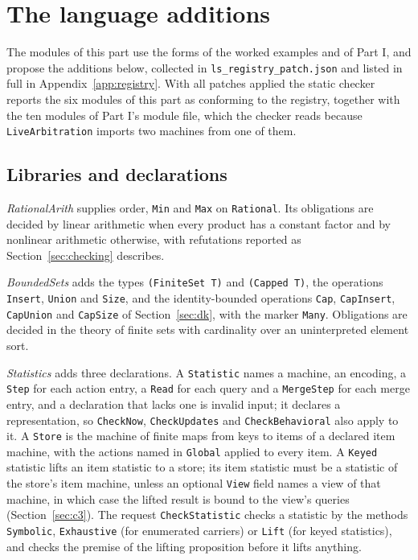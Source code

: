 \documentclass[11pt]{article}
\newcommand{\fpath}[1]{\nolinkurl{#1}}
\newcommand{\code}[1]{\texttt{#1}}
\theoremstyle{definition}
\theoremstyle{plain}
\begin{document}
\section{The language additions}\label{sec:language}

The modules of this part use the forms of the worked examples and of Part I, and propose the
additions below, collected in \fpath{ls_registry_patch.json} and listed in full in
Appendix~\ref{app:registry}. With all patches applied the static checker reports the six modules of
this part as conforming to the registry, together with the ten modules of Part I's module file,
which the checker reads because \code{LiveArbitration} imports two machines from one of them.

\subsection{Libraries and declarations}

\emph{RationalArith} supplies order, \code{Min} and \code{Max} on \code{Rational}. Its obligations
are decided by linear arithmetic when every product has a constant factor and by nonlinear
arithmetic otherwise, with refutations reported as Section~\ref{sec:checking} describes.

\emph{BoundedSets} adds the types \code{(FiniteSet T)} and \code{(Capped T)}, the operations
\code{Insert}, \code{Union} and \code{Size}, and the identity-bounded operations \code{Cap},
\code{CapInsert}, \code{CapUnion} and \code{CapSize} of Section~\ref{sec:dk}, with the marker
\code{Many}. Obligations are decided in the theory of finite sets with cardinality over an
uninterpreted element sort.

\emph{Statistics} adds three declarations. A \code{Statistic} names a machine, an encoding, a
\code{Step} for each action entry, a \code{Read} for each query and a \code{MergeStep} for each
merge entry, and a declaration that lacks one is invalid input; it declares a representation, so
\code{CheckNow}, \code{CheckUpdates} and \code{CheckBehavioral} also apply to it. A \code{Store} is
the machine of finite maps from keys to items of a declared item machine, with the actions named in
\code{Global} applied to every item. A \code{Keyed} statistic lifts an item statistic to a store;
its item statistic must be a statistic of the store's item machine, unless an optional \code{View}
field names a view of that machine, in which case the lifted result is bound to the view's queries
(Section~\ref{sec:c3}). The request \code{CheckStatistic} checks a statistic by the methods
\code{Symbolic}, \code{Exhaustive} (for enumerated carriers) or \code{Lift} (for keyed statistics),
and checks the premise of the lifting proposition before it lifts anything.
\end{document}
